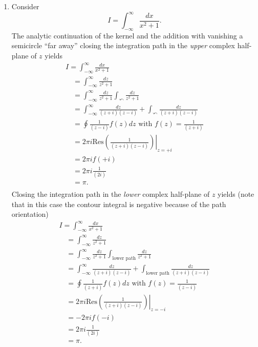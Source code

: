 {
\color{blue}
\bexample


\renewcommand{\labelenumi}{(\roman{enumi})}
\begin{enumerate}

\item  Consider   $$I=\int_{-\infty}^{\infty}\frac{dx}{x^2+1} .$$
The analytic continuation of the kernel and the addition with vanishing a semicircle ``far away'' closing the integration path
in the {\em upper} complex half-plane of $z$ yields
\begin{equation}
\begin{array}{l}
I=\int_{-\infty}^{\infty}\frac{dx}{x^2+1} \\
\quad      =  \int_{-\infty}^{\infty}\frac{dz}{z^2+1}  \\
\quad      = \int_{-\infty}^{\infty}\frac{dz}{z^2+1}  \int_{\curvearrowleft} \frac{dz}{z^2+1} \\
\quad      = \int_{-\infty}^{\infty}\frac{dz}{(z+i)(z-i)} +  \int_{\curvearrowleft} \frac{dz}{(z+i)(z-i)} \\
\quad      = \oint\frac{1}{(z-i)} f(z) dz \textrm{ with } f(z)=\frac{1}{(z+i)} \\
\quad      = 2\pi i \textrm{Res}\left.\left(\frac{1}{(z+i)(z-i)} \right)\right|_{z=+i} \\
\quad      = 2\pi i f(+i)  \\
\quad      = 2\pi i \frac{1}{(2i)}  \\
\quad      = \pi.   \\
\end{array}
\end{equation}
Closing the integration path
in the {\em lower} complex half-plane of $z$ yields (note that in this case the contour integral is negative because of the path orientation)
\begin{equation}
\begin{array}{l}
I=\int_{-\infty}^{\infty}\frac{dx}{x^2+1} \\
\quad      =  \int_{-\infty}^{\infty}\frac{dz}{z^2+1}  \\
\quad      = \int_{-\infty}^{\infty}\frac{dz}{z^2+1}  \int_{\textrm{lower path}} \frac{dz}{z^2+1} \\
\quad      = \int_{-\infty}^{\infty}\frac{dz}{(z+i)(z-i)} + \int_{\textrm{lower path}} \frac{dz}{(z+i)(z-i)} \\
\quad      = \oint\frac{1}{(z+i)} f(z) dz \textrm{ with } f(z)=\frac{1}{(z-i)} \\
\quad      = 2\pi i \textrm{Res}\left.\left(\frac{1}{(z+i)(z-i)} \right)\right|_{z=-i} \\
\quad      = -2\pi i f(-i)  \\
\quad      = 2\pi i \frac{1}{(2i)}  \\
\quad      = \pi.   \\
\end{array}
\end{equation}



\end{enumerate}}
